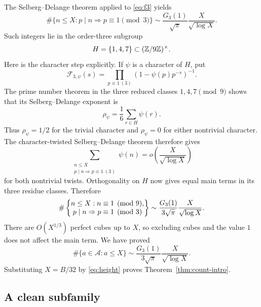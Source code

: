 The Selberg--Delange theorem applied to \eqref{eq:f3} yields
\begin{equation}
 \#\{n\le X:p\mid n\Rightarrow p\equiv1\pmod3\}
 \sim\frac{G_3(1)}{\sqrt\pi}\frac{X}{\sqrt{\log X}}.
\end{equation}
Such integers lie in the order-three subgroup
\[
 H=\{1,4,7\}\subset(\mathbb Z/9\mathbb Z)^\times.
\]
Here is the character step explicitly.  If \(\psi\) is a character of
\(H\), put
\[
 \mathcal F_{3,\psi}(s)
 =\prod_{p\equiv1\ (3)}
   (1-\psi(p)p^{-s})^{-1}.
\]
The prime number theorem in the three reduced classes \(1,4,7\pmod9\)
shows that its Selberg--Delange exponent is
\[
 \rho_\psi=\frac16\sum_{r\in H}\psi(r).
\]
Thus \(\rho_\psi=1/2\) for the trivial character and
\(\rho_\psi=0\) for either nontrivial character.  The
character-twisted Selberg--Delange theorem therefore gives
\[
 \sum_{\substack{n\le X\\p\mid n\Rightarrow p\equiv1\ (3)}}
 \psi(n)
 =o\left(\frac{X}{\sqrt{\log X}}\right)
\]
for both nontrivial twists.  Orthogonality on \(H\) now gives equal main
terms in its three residue classes.  Therefore
\begin{equation}
 \#\left\{
 \begin{array}{@{}c@{}}
 n\le X:n\equiv1\pmod9,\\
 p\mid n\Rightarrow p\equiv1\pmod3
 \end{array}
 \right\}
 \sim
 \frac{G_3(1)}{3\sqrt\pi}\frac{X}{\sqrt{\log X}}.
\end{equation}
There are \(O(X^{1/3})\) perfect cubes up to \(X\), so excluding cubes and
the value \(1\) does not affect the main term.  We have proved
\begin{equation}
 \#\{a\in\mathcal A:a\le X\}
 \sim
 \frac{G_3(1)}{3\sqrt\pi}\frac{X}{\sqrt{\log X}}.
\end{equation}
Substituting \(X=B/32\) by \eqref{eq:height} proves
Theorem~\ref{thm:count-intro}.

\subsection{A clean subfamily}

